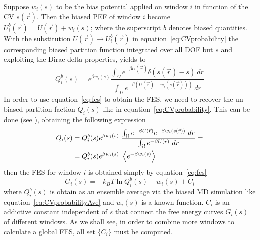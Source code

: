 Suppose $w_i(s)$ to be the bias potential applied on window $i$ in function of the \ac{CV} $s(\vec r)$. Then the biased \ac{PEF} of window $i$ become $U_i^b(\vec r) = U(\vec r) + w_i(s)$; where the superscript $b$ denotes biased quantities. With the substitution $U(\vec r) \rightarrow U_i^b(\vec r)$ in equation~\eqref{eq:CVprobability} the corresponding biased partition function integrated over all \ac{DOF} but $s$ and exploiting the Dirac delta properties, yields to
\begin{equation*}
	Q_i^b(s) = e^{\beta w_i(s)}\frac{ \int_\Omega e^{-\beta U(\vec r)}\delta(s(\vec r) - s)\ dr }{\int_\Omega e^{-\beta (U(\vec r) + w_i(s(\vec r)))}\ dr}
\end{equation*}
In order to use equation~\eqref{eq:fes} to obtain the \ac{FES}, we need to recover the un--biased partition faction $Q_i(s)$ like in equation~\eqref{eq:CVprobability}. This can be done (see \cite{Umbrella}), obtaining the following expression
\begin{equation}
	\begin{aligned}
	Q_i(s) &= Q_i^b(s) e^{\beta w_i(s)}\ \frac{ \int_\Omega e^{-\beta U(\vec r)}e^{-\beta w_i(s(\vec r))}\ dr }{\int_\Omega e^{-\beta U(\vec r)}\ dr} = \\
		   &= Q_i^b(s) e^{\beta w_i(s)}\ \left \langle e^{-\beta w_i(s)} \right \rangle
	\end{aligned}
	\label{eq:windowPartFunc}
\end{equation}
then the \ac{FES} for window $i$ is obtained simply by equation~\eqref{eq:fes}
\begin{equation*}
	G_i(s) = -k_BT \ln Q_i^b(s) - w_i(s) + C_i
\end{equation*}
where $Q_i^b(s)$ is obtain as an ensemble average via the biased \ac{MD} simulation like equation~\eqref{eq:CVprobabilityAve} and $w_i(s)$ is a known function. $C_i$ is an addictive constant independent of $s$ that connect the free energy curves $G_i(s)$ of different windows. As we shall see, in order to combine more windows to calculate a global \ac{FES}, all set $\{C_i\}$ must be computed.


